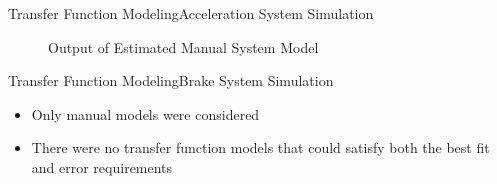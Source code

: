 \documentclass{beamer}
\begin{document}
\begin{frame}{Transfer Function Modeling}{Acceleration System Simulation}
\begin{block}{}
\begin{figure}
\begin{minipage}{0.45\textwidth}
        \caption{Output of Estimated Manual System Model}
        \label{fig:manualAccelModel}
    \end{minipage}
\end{figure}
  \end{block}
\end{frame}
\begin{frame}{Transfer Function Modeling}{Brake System Simulation}
\begin{block}{}
 \begin{itemize}
	\item Only manual models were considered 
	\item There were no transfer function models that could satisfy both the best fit and error requirements 
 \end{itemize}
  \end{block}
\end{frame}
\end{document}
